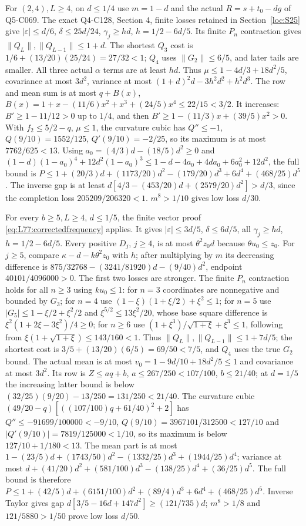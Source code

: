 For $(2,4),L\ge4$, on $d\le1/4$ use $m=1-d$ and the actual
$R=s+t_0-dg$ of Q5-C069.
The exact Q4-C128, Section 4, finite losses retained in
Section~\ref{loc:S25} give
$|\varepsilon|\le d/6$, $\delta\le25d/24$,
$\gamma_j\ge hd$, $h=1/2-6d/5$.
Its finite $P_n$ contraction gives
$\|Q_L\|,\|Q_{L-1}\|\le1+d$.
The shortest $Q_3$ cost is $1/6+(13/20)(25/24)=27/32<1$;
$Q_4$ uses $\|G_2\|\le6/5$, and later tails are smaller.
All three actual $\alpha$ terms are at least $hd$.
Thus $\mu\le1-4d/3+18d^2/5$, covariance at most $3d^2$,
variance at most $(1+d)^2d-3h^2d^2+h^2d^3$.
The row and mean sum is at most $q+B(x)$,
$B(x)=1+x-(11/6)x^2+x^3+(24/5)x^4\le22/15<3/2$.
It increases: $B'\ge1-11/12>0$ up to $1/4$, and then
$B'\ge1-(11/3)x+(39/5)x^2>0$.
With $f_2\le5/2-q$, $\mu\le1$, the curvature cubic has
$Q''\le-1$, $Q(9/10)=1552/125$, $Q'(9/10)=-2/25$,
so its maximum is at most $7762/625<13$.
Using $a_0=(4/3)d-(18/5)d^2\ge0$ and
$(1-d)(1-a_0)^4+12d^2(1-a_0)^3
\le1-d-4a_0+4da_0+6a_0^2+12d^2$,
the full bound is
$P\le1+(20/3)d+(1173/20)d^2-(179/20)d^3+6d^4+(468/25)d^5$.
The inverse gap is at least
$d[4/3-(453/20)d+(2579/20)d^2]>d/3$, since the completion loss
$205209/206320<1$.
$m^8>1/10$ gives low loss $d/30$.

For every $b\ge5,L\ge4$, $d\le1/5$, the finite vector proof \eqref{eq:L77:correctedfrequency} applies.
It gives $|\varepsilon|\le3d/5$, $\delta\le6d/5$,
all $\gamma_j\ge hd$, $h=1/2-6d/5$.
Every positive $D_j$, $j\ge4$, is at most $\theta^2z_0d$
because $\theta u_0\le z_0$.
For $j\ge5$, compare $\kappa-d-k\theta^2z_0$ with $h$;
after multiplying by $m$ its decreasing difference is
$875/32768-(3241/81920)d-(9/40)d^2$, endpoint
$40101/4096000>0$. The first two losses are stronger.
The finite $P_n$ contraction holds for all $n\ge3$ using $ku_0\le1$:
for $n=3$ coordinates are nonnegative and bounded by $G_3$;
for $n=4$ use $(1-\xi)(1+\xi/2)+\xi^2\le1$;
for $n=5$ use $|G_5|\le1-\xi/2+\xi^2/2$ and
$\xi^{5/2}\le13\xi^2/20$, whose base square difference is
$\xi^2(1+2\xi-3\xi^2)/4\ge0$;
for $n\ge6$ use $(1+\xi^3)/\sqrt{1+\xi}+\xi^3\le1$,
following from $\xi(1+\sqrt{1+\xi})\le143/160<1$.
Thus $\|Q_L\|,\|Q_{L-1}\|\le1+7d/5$;
the shortest cost is $3/5+(13/20)(6/5)=69/50<7/5$,
and $Q_4$ uses the true $G_2$ bound.
The actual mean is at most $v_0=1-9d/10+18d^2/5\le1$ and
covariance at most $3d^2$.
Its row is $Z\le aq+b$, $a\le267/250<107/100$,
$b\le21/40$; at $d=1/5$ the increasing latter bound is below
$(32/25)(9/20)-13/250=131/250<21/40$.
The curvature cubic
$(49/20-q)[((107/100)q+61/40)^2+2]$ has
$Q''\le-91699/100000<-9/10$,
$Q(9/10)=3967101/312500<127/10$ and
$|Q'(9/10)|=7819/125000<1/10$, so its maximum is below
$127/10+1/180<13$.
The mean part is at most
$1-(23/5)d+(1743/50)d^2-(1332/25)d^3+(1944/25)d^4$;
variance at most
$d+(41/20)d^2+(581/100)d^3-(138/25)d^4+(36/25)d^5$.
The full bound is therefore
$P\le1+(42/5)d+(6151/100)d^2+(89/4)d^3+6d^4+(468/25)d^5$.
Inverse Taylor gives gap
$d[3/5-16d+147d^2]\ge(121/735)d$;
$m^8>1/8$ and $121/5880>1/50$ prove low loss $d/50$.

